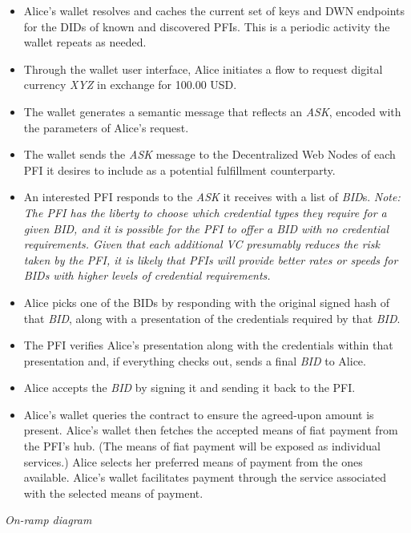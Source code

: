 \documentclass[11pt]{article}
\begin{document}
\begin{itemize}
	\item Alice’s wallet resolves and caches the current set of keys and DWN endpoints for the DIDs of known and discovered PFIs. This is a periodic activity the wallet repeats as needed.

	\item Through the wallet user interface, Alice initiates a flow to request digital currency \textit{XYZ} in exchange for 100.00 USD.

	\item The wallet generates a semantic message that reflects an \textit{ASK}, encoded with the parameters of Alice’s request.  

	\item The wallet sends the \textit{ASK} message to the Decentralized Web Nodes of each PFI it desires to include as a potential fulfillment counterparty.

	\item An interested PFI responds to the \textit{ASK} it receives with a list of \textit{BID}s.\textit{ Note: The PFI has the liberty to choose which credential types they require for a given BID, and it is possible for the PFI to offer a BID with no credential requirements. Given that each additional VC presumably reduces the risk taken by the PFI, it is likely that PFIs will provide better rates or speeds for BIDs with higher levels of credential requirements. }

	\item Alice picks one of the BIDs by responding with the original signed hash of that \textit{BID}, along with a presentation of the credentials required by that \textit{BID}. 

	\item The PFI verifies Alice’s presentation along with the credentials within that presentation and, if everything checks out, sends a final \textit{BID} to Alice.

	\item Alice accepts the \textit{BID} by signing it and sending it back to the PFI.

	\item Alice’s wallet queries the contract to ensure the agreed-upon amount is present. Alice’s wallet then fetches the accepted means of fiat payment from the PFI’s hub. (The means of fiat payment will be exposed as individual services.) Alice selects her preferred means of payment from the ones available. Alice’s wallet facilitates payment through the service associated with the selected means of payment.


\vspace{1\baselineskip}
\end{itemize}
\begin{center}
\textit{On-ramp diagram}
\end{center}
\end{document}
